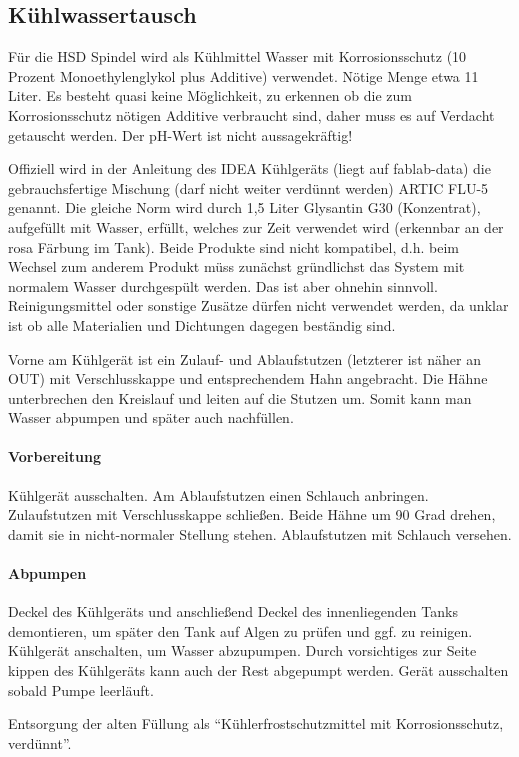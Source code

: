 \documentclass{\basedir/fablab-document}
\begin{document}
\subsection{Kühlwassertausch}
Für die HSD Spindel wird als Kühlmittel Wasser mit Korrosionsschutz (10 Prozent Monoethylenglykol plus Additive) verwendet. Nötige Menge etwa 11 Liter. Es besteht quasi keine Möglichkeit, zu erkennen ob die zum Korrosionsschutz nötigen Additive verbraucht sind, daher muss es auf Verdacht getauscht werden. Der pH-Wert ist nicht aussagekräftig!

Offiziell wird in der Anleitung des IDEA Kühlgeräts (liegt auf fablab-data) die gebrauchsfertige Mischung (darf nicht weiter verdünnt werden) ARTIC FLU-5 genannt. Die gleiche Norm wird durch 1,5 Liter Glysantin G30 (Konzentrat), aufgefüllt mit Wasser, erfüllt, welches zur Zeit verwendet wird (erkennbar an der rosa Färbung im Tank). Beide Produkte sind nicht kompatibel, d.h. beim Wechsel zum anderem Produkt müss zunächst gründlichst das System mit normalem Wasser durchgespült werden. Das ist aber ohnehin sinnvoll. Reinigungsmittel oder sonstige Zusätze dürfen nicht verwendet werden, da unklar ist ob alle Materialien und Dichtungen dagegen beständig sind.

Vorne am Kühlgerät ist ein Zulauf- und Ablaufstutzen (letzterer ist näher an OUT) mit Verschlusskappe und entsprechendem Hahn angebracht. Die Hähne unterbrechen den Kreislauf und leiten auf die Stutzen um. Somit kann man Wasser abpumpen und später auch nachfüllen.

\paragraph{Vorbereitung} Kühlgerät ausschalten. Am Ablaufstutzen einen Schlauch anbringen. Zulaufstutzen mit Verschlusskappe schließen. Beide Hähne um 90 Grad drehen, damit sie in nicht-normaler Stellung stehen. Ablaufstutzen mit Schlauch versehen.

\paragraph{Abpumpen} Deckel des Kühlgeräts und anschließend Deckel des innenliegenden Tanks demontieren, um später den Tank auf Algen zu prüfen und ggf. zu reinigen. Kühlgerät anschalten, um Wasser abzupumpen. Durch vorsichtiges zur Seite kippen des Kühlgeräts kann auch der Rest abgepumpt werden. Gerät ausschalten sobald Pumpe leerläuft.

Entsorgung der alten Füllung als \enquote{Kühlerfrostschutzmittel mit Korrosionsschutz, verdünnt}. 
\end{document}
